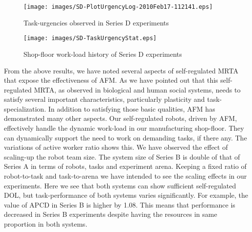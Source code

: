 \documentclass{intech}
\begin{document}
\begin{figure}
\begin{minipage}[t]{0.48\linewidth}
\centering
\texttt{[image: images/SD-PlotUrgencyLog-2010Feb17-112141.eps]}
\caption{\small Task-urgencies observed in Series D experiments}
\label{fig:raw-urgencies-SD} 
\end{minipage} 
\hspace{0.5cm}
\begin{minipage}[t]{0.48\linewidth}
\centering
\texttt{[image: images/SD-TaskUrgencyStat.eps]}
\caption{\small Shop-floor work-load history of Series D experiments}
\label{fig:workload-SD}  
\end{minipage}
\end{figure}
From the above results, we have noted several aspects of self-regulated MRTA that expose the effectiveness of AFM. As we have pointed out that this self-regulated MRTA, as observed in biological and human social systems, needs to satisfy several important characteristics, particularly plasticity and task-specialization. In addition to satisfying those basic qualities, AFM has demonstrated many other aspects. Our self-regulated robots, driven by AFM, effectively handle the dynamic work-load in our manufacturing shop-floor. They can dynamically support the need to work on demanding tasks, if there any. The variations of active worker ratio shows this.
We have observed the effect of scaling-up the robot team size. The system size of Series B is double of that of Series A in terms of robots, tasks and experiment arena. Keeping a fixed ratio of robot-to-task and task-to-arena we have intended to see the scaling effects in our experiments. Here we see that both systems can show sufficient self-regulated DOL, but task-performance of both systems varies significantly. For example, the value of APCD in Series B is higher by 1.08. This means that performance  is decreased in Series B experiments despite having the resources in same proportion in both systems. 
\end{document}
